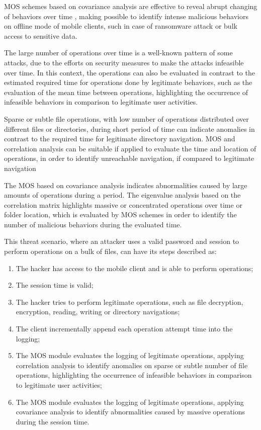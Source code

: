 \documentclass[twocolumn]{svjour3}          	%
\begin{document}
MOS schemes based on covariance analysis are effective to reveal abrupt changing of behaviors over time \cite{tenorio2013greatest}, making possible to identify intense malicious behaviors on offline mode of mobile clients, such in case of ransomware attack or bulk access to sensitive data.

The large number of operations over time is a well-known pattern of some attacks, due to the efforts on security measures to make the attacks infeasible over time. In this context, the operations can also be evaluated in contrast to the estimated required time for operations done by legitimate behaviors, such as the evaluation of the mean time between operations, highlighting the occurrence of infeasible behaviors in comparison to legitimate user activities.

Sparse or subtle file operations, with low number of operations distributed over different files or directories, during short period of time can indicate anomalies in contrast to the required time for legitimate directory navigation. MOS and correlation analysis can be suitable if applied to evaluate the time and location of operations, in order to identify unreachable navigation, if compared to legitimate navigation

The MOS based on covariance analysis indicates abnormalities caused by large amounts of operations during a period. The eigenvalue analysis based on the correlation matrix highlights massive or concentrated operations over time or folder location, which is evaluated by MOS schemes in order to identify the number of malicious behaviors during the evaluated time.

This threat scenario, where an attacker uses a valid password and session to perform operations on a bulk of files, can have its steps described as:

\begin{enumerate}[label=(\alph*)]
	\item The hacker has access to the mobile client and is able to perform operations;
	\item The session time is valid;
	\item The hacker tries to perform legitimate operations, such as file decryption, encryption, reading, writing or directory navigations;
	\item The client incrementally append each operation attempt time into the logging;
	\item The MOS module evaluates the logging of legitimate operations, applying correlation analysis to identify anomalies on sparse or subtle number of file operations, highlighting the occurrence of infeasible behaviors in comparison to legitimate user activities;
	\item The MOS module evaluates the logging of legitimate operations, applying covariance analysis to identify abnormalities caused by massive operations during the session time.
\end{enumerate}
\end{document}
